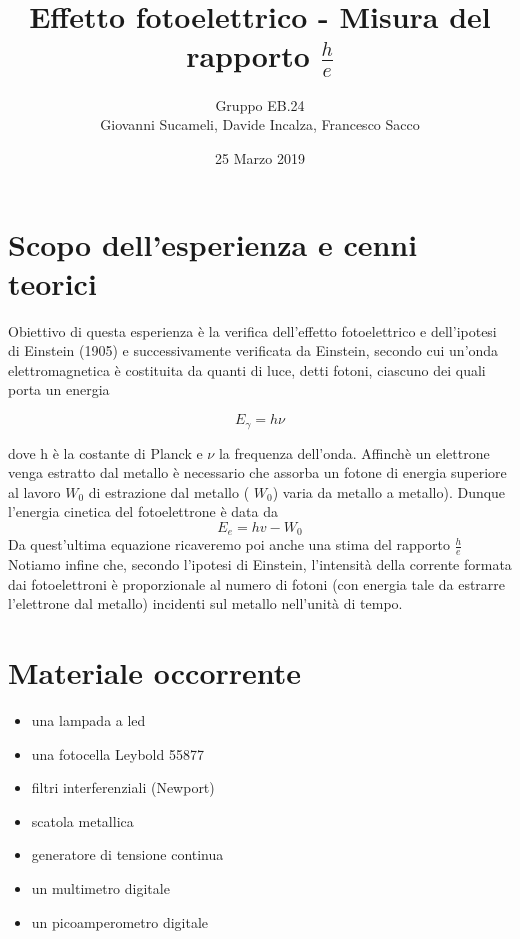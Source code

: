 \documentclass[10pt,a4paper]{article}
\author{Gruppo EB.24 \\Giovanni Sucameli, Davide Incalza, Francesco Sacco}
\title{Effetto fotoelettrico - Misura del rapporto $\frac{h}{e}$}
\begin{document}
\date{25 Marzo 2019}
\maketitle
\section*{Scopo dell'esperienza e cenni teorici}
Obiettivo di questa esperienza è la verifica dell'effetto fotoelettrico e dell'ipotesi di Einstein (1905) e successivamente verificata da Einstein, secondo cui un'onda elettromagnetica è costituita da quanti di luce, detti fotoni, ciascuno dei quali porta un energia 

\begin{equation}
 E_{\gamma} = h\nu
\label{energia}
\end{equation}

dove h è la costante di Planck e $ \nu $ la frequenza dell'onda. Affinchè un elettrone venga estratto dal metallo è necessario che assorba un fotone di energia superiore al lavoro $ W_{0}$ di estrazione dal metallo ( $ W_{0} $)  varia da metallo a metallo). Dunque l'energia cinetica del fotoelettrone è data da
\begin{equation}
    E_{e} = hv - W_{0}
\label{foto}
\end{equation}
Da quest'ultima equazione ricaveremo poi anche una stima del rapporto $ \frac{h}{e} $
Notiamo infine che, secondo l'ipotesi di Einstein, l'intensità della corrente formata dai fotoelettroni è proporzionale al numero di fotoni (con energia tale da estrarre l'elettrone dal metallo) incidenti sul metallo nell'unità di tempo.

\section*{Materiale occorrente}

\begin{itemize}
\item una lampada a led
\item una fotocella Leybold 55877 
\item filtri interferenziali (Newport)
\item scatola metallica
\item generatore di tensione continua
\item un multimetro digitale
\item un picoamperometro digitale
\end{itemize}
\end{document}
